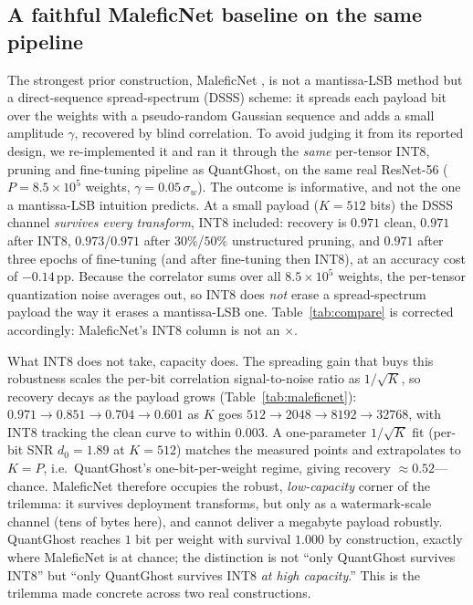 \documentclass[10pt,journal]{IEEEtran}
\theoremstyle{remark}
\newcommand{\sys}{\mbox{QuantGhost}}
\begin{document}
\subsection{A faithful MaleficNet baseline on the same pipeline}\label{sec:maleficnet}
The strongest prior construction, MaleficNet \cite{hitaj2022maleficnet}, is not a
mantissa-LSB method but a direct-sequence spread-spectrum (DSSS) scheme: it spreads each
payload bit over the weights with a pseudo-random Gaussian sequence and adds a small
amplitude $\gamma$, recovered by blind correlation. To avoid judging it from its reported
design, we re-implemented it and ran it through the \emph{same} per-tensor INT8, pruning and
fine-tuning pipeline as \sys, on the same real ResNet-56 ($P=8.5\times10^{5}$ weights,
$\gamma=0.05\,\sigma_w$). The outcome is informative, and not the one a mantissa-LSB intuition
predicts. At a small payload ($K=512$ bits) the DSSS channel \emph{survives every transform},
INT8 included: recovery is $0.971$ clean, $0.971$ after INT8, $0.973$/$0.971$ after $30\%$/$50\%$
unstructured pruning, and $0.971$ after three epochs of fine-tuning (and after fine-tuning
then INT8), at an accuracy cost of $-0.14$\,pp. Because the correlator sums over all
$8.5\times10^{5}$ weights, the per-tensor quantization noise averages out, so INT8 does
\emph{not} erase a spread-spectrum payload the way it erases a mantissa-LSB one. Table~\ref{tab:compare}
is corrected accordingly: MaleficNet's INT8 column is not an $\times$.

What INT8 does not take, capacity does. The spreading gain that buys this robustness scales
the per-bit correlation signal-to-noise ratio as $1/\sqrt{K}$, so recovery decays as the
payload grows (Table~\ref{tab:maleficnet}): $0.971\to0.851\to0.704\to0.601$ as $K$ goes
$512\to2048\to8192\to32768$, with INT8 tracking the clean curve to within $0.003$. A
one-parameter $1/\sqrt{K}$ fit (per-bit SNR $d_0{=}1.89$ at $K{=}512$) matches the measured
points and extrapolates to $K=P$, i.e.\ \sys's one-bit-per-weight regime, giving recovery
$\approx0.52$---chance. MaleficNet therefore occupies the robust, \emph{low-capacity} corner of
the trilemma: it survives deployment transforms, but only as a watermark-scale channel (tens of
bytes here), and cannot deliver a megabyte payload robustly. \sys{} reaches $1$ bit per weight
with survival $1.000$ by construction, exactly where MaleficNet is at chance; the distinction is
not ``only \sys{} survives INT8'' but ``only \sys{} survives INT8 \emph{at high capacity}.''
This is the trilemma made concrete across two real constructions.
\end{document}
